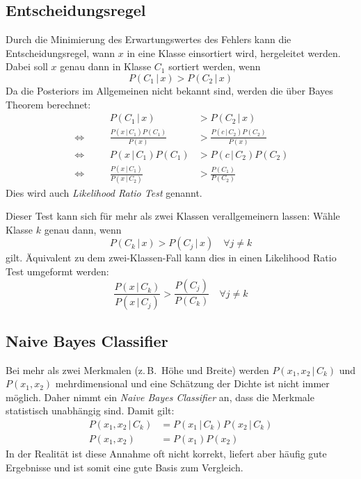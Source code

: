 \documentclass[a4paper, 11pt, accentcolor = tud3b]{tudreport}
\newcommand{\given}{\,\vert\,}
\newcommand{\zB}{z.\,B.~}
\begin{document}
			\subsection{Entscheidungsregel}
				Durch die Minimierung des Erwartungswertes des Fehlers kann die Entscheidungsregel, wann \(x\) in eine Klasse einsortiert wird, hergeleitet werden. Dabei soll \(x\) genau dann in Klasse \(C_1\) sortiert werden, wenn
				\begin{equation*}
					P(C_1 \given x) > P(C_2 \given x)
				\end{equation*}
				Da die Posteriors im Allgemeinen nicht bekannt sind, werden die über Bayes Theorem berechnet:
				\begin{align*}
					               &  & P(C_1 \given x)                         & > P(C_2 \given x)                     &  \\
					\quad\iff\quad &  & \frac{P(x \given C_1) P(C_1)}{P(x)}     & > \frac{P(c \given C_2) P(C_2)}{P(x)} &  \\
					\quad\iff\quad &  & P(x \given C_1) P(C_1)                  & > P(c \given C_2) P(C_2)              &  \\
					\quad\iff\quad &  & \frac{P(x \given C_1)}{P(x \given C_2)} & > \frac{P(C_1)}{P(C_2)}               &
				\end{align*}
				Dies wird auch \emph{Likelihood Ratio Test} genannt.
				
				Dieser Test kann sich für mehr als zwei Klassen verallgemeinern lassen: Wähle Klasse \( k \) genau dann, wenn
				\begin{equation*}
					P(C_k \given x) > P(C_j \given x) \quad\forall j \neq k
				\end{equation*}
				gilt. Äquivalent zu dem zwei-Klassen-Fall kann dies in einen Likelihood Ratio Test umgeformt werden:
				\begin{equation*}
					\frac{P(x \given C_k)}{P(x \given C_j)} > \frac{P(C_j)}{P(C_k)} \quad\forall j \neq k
				\end{equation*}

			\subsection{Naive Bayes Classifier}
				Bei mehr als zwei Merkmalen (\zB Höhe und Breite) werden \( P(x_1, x_2 \given C_k) \) und \( P(x_1, x_2) \) mehrdimensional und eine Schätzung der Dichte ist nicht immer möglich. Daher nimmt ein \emph{Naive Bayes Classifier} an, dass die Merkmale statistisch unabhängig sind. Damit gilt:
				\begin{align*}
					P(x_1, x_2 \given C_k) & = P(x_1 \given C_k) P(x_2 \given C_k) \\
					P(x_1, x_2)            & = P(x_1) P(x_2)
				\end{align*}
				In der Realität ist diese Annahme oft nicht korrekt, liefert aber häufig gute Ergebnisse und ist somit eine gute Basis zum Vergleich.
\end{document}
